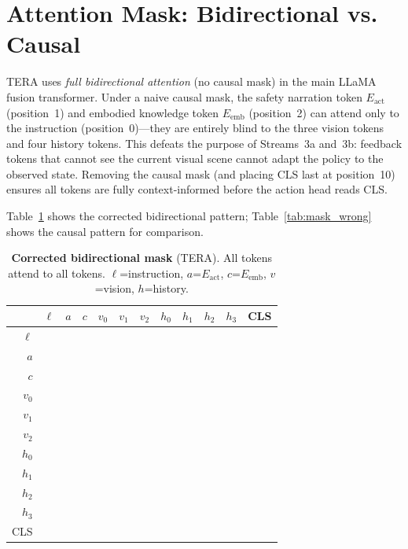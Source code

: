 \documentclass{article}
\newcommand{\cmark}{\ding{51}}
\begin{document}
\section{Attention Mask: Bidirectional vs. Causal}
\label{app:mask}

TERA uses \emph{full bidirectional attention} (no causal mask) in the main
LLaMA fusion transformer.
Under a naive causal mask, the safety narration token $E_{\mathrm{act}}$
(position~1) and embodied knowledge token $E_{\mathrm{emb}}$ (position~2) can
attend only to the instruction (position~0)---they are entirely blind to the
three vision tokens and four history tokens.
This defeats the purpose of Streams~3a and~3b: feedback tokens that cannot see
the current visual scene cannot adapt the policy to the observed state.
Removing the causal mask (and placing CLS last at position~10) ensures all
tokens are fully context-informed before the action head reads CLS.

Table~\ref{tab:mask_correct} shows the corrected bidirectional pattern;
Table~\ref{tab:mask_wrong} shows the causal pattern for comparison.

\begin{table}[h]
\centering
\caption{\textbf{Corrected bidirectional mask} (TERA). All tokens attend to all tokens.
         $\ell$=instruction, $a$=$E_\mathrm{act}$, $c$=$E_\mathrm{emb}$, $v$=vision, $h$=history.}
\label{tab:mask_correct}
\scriptsize
\setlength{\tabcolsep}{3.5pt}
\begin{tabular}{r|ccccccccccc}
\toprule
 & $\ell$ & $a$ & $c$ & $v_0$ & $v_1$ & $v_2$ & $h_0$ & $h_1$ & $h_2$ & $h_3$ & CLS \\
\midrule
$\ell$ & \cmark&\cmark&\cmark&\cmark&\cmark&\cmark&\cmark&\cmark&\cmark&\cmark&\cmark \\
$a$    & \cmark&\cmark&\cmark&\cmark&\cmark&\cmark&\cmark&\cmark&\cmark&\cmark&\cmark \\
$c$    & \cmark&\cmark&\cmark&\cmark&\cmark&\cmark&\cmark&\cmark&\cmark&\cmark&\cmark \\
$v_0$  & \cmark&\cmark&\cmark&\cmark&\cmark&\cmark&\cmark&\cmark&\cmark&\cmark&\cmark \\
$v_1$  & \cmark&\cmark&\cmark&\cmark&\cmark&\cmark&\cmark&\cmark&\cmark&\cmark&\cmark \\
$v_2$  & \cmark&\cmark&\cmark&\cmark&\cmark&\cmark&\cmark&\cmark&\cmark&\cmark&\cmark \\
$h_0$  & \cmark&\cmark&\cmark&\cmark&\cmark&\cmark&\cmark&\cmark&\cmark&\cmark&\cmark \\
$h_1$  & \cmark&\cmark&\cmark&\cmark&\cmark&\cmark&\cmark&\cmark&\cmark&\cmark&\cmark \\
$h_2$  & \cmark&\cmark&\cmark&\cmark&\cmark&\cmark&\cmark&\cmark&\cmark&\cmark&\cmark \\
$h_3$  & \cmark&\cmark&\cmark&\cmark&\cmark&\cmark&\cmark&\cmark&\cmark&\cmark&\cmark \\
CLS    & \cmark&\cmark&\cmark&\cmark&\cmark&\cmark&\cmark&\cmark&\cmark&\cmark&\cmark \\
\bottomrule
\end{tabular}
\end{table}
\end{document}
